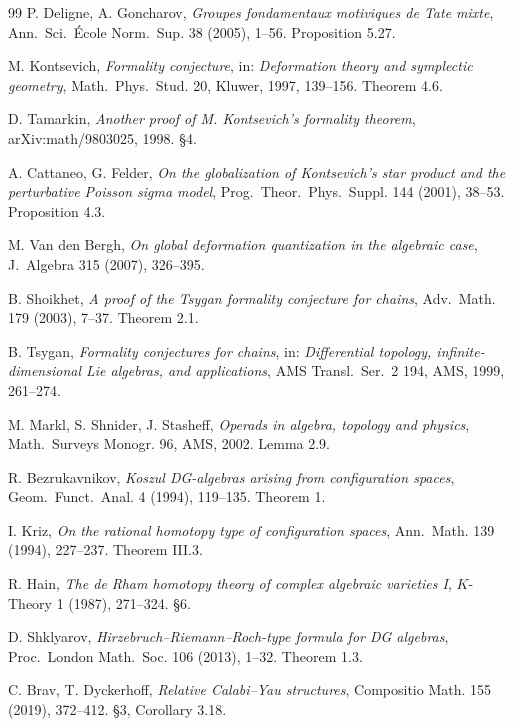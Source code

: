 \documentclass[11pt,reqno]{amsart}
\theoremstyle{plain}
\theoremstyle{definition}
\theoremstyle{remark}
\begin{document}
\begin{thebibliography}{99}
 P. Deligne, A. Goncharov, \emph{Groupes fondamentaux motiviques de Tate mixte}, Ann.~Sci.~\'Ecole Norm.~Sup. 38 (2005), 1--56. Proposition 5.27.

 M. Kontsevich, \emph{Formality conjecture}, in: \emph{Deformation theory and symplectic geometry}, Math.~Phys.~Stud. 20, Kluwer, 1997, 139--156. Theorem 4.6.

 D. Tamarkin, \emph{Another proof of M. Kontsevich's formality theorem}, arXiv:math/9803025, 1998. \S4.

 A. Cattaneo, G. Felder, \emph{On the globalization of Kontsevich's star product and the perturbative Poisson sigma model}, Prog.~Theor.~Phys.~Suppl. 144 (2001), 38--53. Proposition 4.3.

 M. Van den Bergh, \emph{On global deformation quantization in the algebraic case}, J.~Algebra 315 (2007), 326--395.

 B. Shoikhet, \emph{A proof of the Tsygan formality conjecture for chains}, Adv.~Math. 179 (2003), 7--37. Theorem 2.1.

 B. Tsygan, \emph{Formality conjectures for chains}, in: \emph{Differential topology, infinite-dimensional Lie algebras, and applications}, AMS Transl.~Ser.~2 194, AMS, 1999, 261--274.

 M. Markl, S. Shnider, J. Stasheff, \emph{Operads in algebra, topology and physics}, Math.~Surveys Monogr. 96, AMS, 2002. Lemma 2.9.

 R. Bezrukavnikov, \emph{Koszul DG-algebras arising from configuration spaces}, Geom.~Funct.~Anal. 4 (1994), 119--135. Theorem 1.

 I. Kriz, \emph{On the rational homotopy type of configuration spaces}, Ann.~Math. 139 (1994), 227--237. Theorem III.3.

 R. Hain, \emph{The de Rham homotopy theory of complex algebraic varieties I}, $K$-Theory 1 (1987), 271--324. \S6.

 D. Shklyarov, \emph{Hirzebruch--Riemann--Roch-type formula for DG algebras}, Proc.~London Math.~Soc. 106 (2013), 1--32. Theorem 1.3.

 C. Brav, T. Dyckerhoff, \emph{Relative Calabi--Yau structures}, Compositio Math. 155 (2019), 372--412. \S3, Corollary 3.18.


\end{thebibliography}
\end{document}
